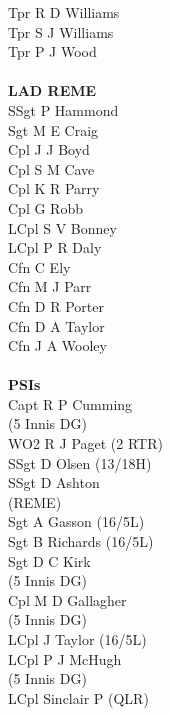 \begin{multicols}{4}
  Tpr R D Williams \\
  Tpr S J Williams \\
  Tpr P J Wood \\
  \\
  \textbf{LAD REME} \\
  SSgt P Hammond \\
  Sgt M E Craig \\
  Cpl J J Boyd \\
  Cpl S M Cave \\
  Cpl K R Parry \\
  Cpl G Robb \\
  LCpl S V Bonney \\
  LCpl P R Daly \\
  Cfn C Ely \\
  Cfn M J Parr \\
  Cfn D R Porter \\
  Cfn D A Taylor \\
  Cfn J A Wooley \\
  \\
  \textbf{PSIs} \\
  Capt R P Cumming \\ \indent (5 Innis DG) \\
  WO2 R J Paget (2 RTR) \\
  SSgt D Olsen (13/18H) \\
  SSgt D Ashton \\ \indent (REME) \\
  Sgt A Gasson (16/5L) \\
  Sgt B Richards (16/5L) \\
  Sgt D C Kirk \\ \indent (5 Innis DG) \\
  Cpl M D Gallagher \\ \indent (5 Innis DG) \\
  LCpl J Taylor (16/5L) \\
  LCpl P J McHugh \\ \indent (5 Innis DG) \\
  LCpl Sinclair P (QLR)
\end{multicols}

\pagebreak
